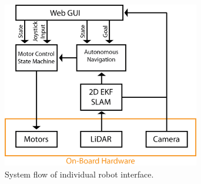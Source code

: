 \begin{figure}
\centering
\includegraphics[width=3.4in]{pictures/Korpela_GUI.png}
\caption{System flow of individual robot interface.}
\label{gui}
\end{figure}
